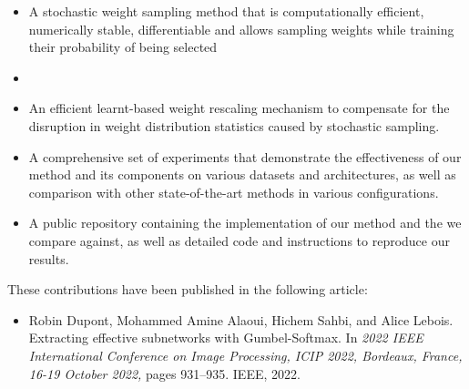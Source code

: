 \begin{itemize}
      \item A stochastic weight sampling method that is computationally
            efficient, numerically stable, differentiable and allows sampling
            weights while training their probability of being selected\DIFdelbegin {}\DIFdelend \DIFaddbegin {}

      \item {}

      \DIFaddend \item An efficient learnt-based weight rescaling mechanism to compensate
            for the disruption in weight distribution statistics caused by
            stochastic sampling. \DIFaddbegin {}

      \DIFaddend \item A comprehensive set of experiments that demonstrate the
            effectiveness of our method and \DIFaddbegin {}\DIFaddend its components
            on various datasets and architectures, as well as comparison with
            other state-of-the-art methods in various configurations.
\DIFaddbegin 

      \DIFaddend \item A public repository containing the implementation of our method and
            the \DIFdelbegin {}\DIFdelend \DIFaddbegin {}\DIFaddend we compare against, as well as detailed code and instructions to
            reproduce our results.\\
\end{itemize}

\noindent These contributions have been published in the following article:
\begin{itemize}
      \item Robin Dupont, Mohammed Amine Alaoui, Hichem Sahbi, and Alice
            Lebois. Extracting effective subnetworks with Gumbel-Softmax. In \textit{2022
                  IEEE International Conference on Image Processing, ICIP 2022, Bordeaux,
                  France, 16-19 October 2022,} pages 931–935. IEEE, 2022.\\
\end{itemize}


